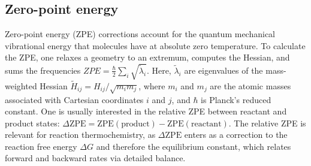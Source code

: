 \documentclass[pdflatex,sn-mathphys-num]{sn-jnl}%
\begin{document}
\subsection{Zero-point energy}
Zero-point energy (ZPE) corrections account for the quantum mechanical vibrational energy that molecules have at absolute zero temperature. To calculate the ZPE, one relaxes a geometry to an extremum, computes the Hessian, and sums the frequencies
$ZPE = \frac{\hbar}{2} \sum_i \sqrt{\tilde{\lambda}_i}$.
Here, $\tilde{\lambda}_i$ are eigenvalues of the mass-weighted Hessian $\tilde{H}_{ij}=H_{ij}/\sqrt{m_i m_j}$, where $m_i$ and $m_j$ are the atomic masses associated with Cartesian coordinates $i$ and $j$, and $\hbar$ is Planck's reduced constant.
One is usually interested in the relative ZPE between reactant and product states: $\Delta\mathrm{ZPE}=\mathrm{ZPE}(\mathrm{product})-\mathrm{ZPE}(\mathrm{reactant})$. The relative ZPE is relevant for reaction thermochemistry, as $\Delta\mathrm{ZPE}$ enters as a correction to the reaction free energy $\Delta G$ and therefore the equilibrium constant, which relates forward and backward rates via detailed balance.
\end{document}
